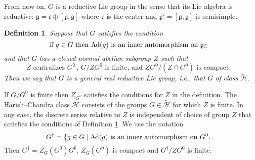 \documentclass{conm-p-l}
\newtheorem{definition}[equation]{Definition}
\renewcommand{\gg}{\mathfrak{g}}
\def\gc{\mathfrak{c}}
\def\gg{\mathfrak{g}}
\def\Ad{{\rm Ad}}
\def\C{\mathbb{C}}
\def\cH{\mathcal{H}}
\begin{document}
\subsection{} \label{ssec3a}  
\setcounter{equation}{0}
From now on, $G$ is a reductive Lie group in
the sense that its Lie algebra is reductive: $\gg = \gc \oplus [\gg,\gg]$
where $\gc$ is the center and $\gg' = [\gg,\gg]$ is semisimple.
\begin{definition}\label{3.1.1}
{\rm Suppose that $G$ satisfies the condition
$$
\text{if $g \in G$ then $\Ad(g)$ is an inner automorphism on }\gg_\C
$$
and that $G$ has a closed normal abelian subgroup $Z$ such that
$$
Z \text{ centralizes } G^0\,,\, G/ZG^0 \text{ is finite, and }
	ZG^0/(Z\cap G^0) \text{ is compact.}
$$
Then we say that $G$ is a {\em general real reductive Lie group}, i.e.,
that $G$ of class $\widetilde{\cH}$.
}
\end{definition}
If $G/G^0$ is finite then $Z_{G^0}$ satisfies the conditions for $Z$ in 
the definition.  The Harish--Chandra class $\cH$ consists of the groups
$G \in \widetilde{\cH}$ for which $Z$ is finite.  In any case, the 
discrete series relative to $Z$ is independent of choice of group $Z$ that
satisfies the conditions of Definition \ref{3.1.1}.  We use the notation
\begin{equation}\label{3.1.3}
G^\dagger = \{g \in G \mid \Ad(g) \text{ is an inner automorphism on } G^0.
\end{equation}
Then $G^\dagger = Z_G(G^0)G^0$, $Z_G(G^0)$ is compact and $G^\dagger/ZG^0$
is finite.
\end{document}
